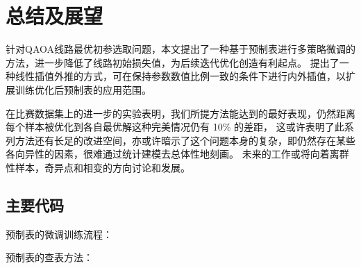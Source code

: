 \documentclass[withoutpreface,bwprint]{cumcmthesis}
\begin{document}
\section{总结及展望}

针对QAOA线路最优初参选取问题，本文提出了一种基于预制表进行多策略微调的方法，进一步降低了线路初始损失值，为后续迭代优化创造有利起点。
提出了一种线性插值外推的方式，可在保持参数数值比例一致的条件下进行内外插值，以扩展训练优化后预制表的应用范围。

在比赛数据集上的进一步的实验表明，我们所提方法能达到的最好表现，仍然距离每个样本被优化到各自最优解这种完美情况仍有 10\% 的差距，
这或许表明了此系列方法还有长足的改进空间，亦或许暗示了这个问题本身的复杂，即仍然存在某些各向异性的因素，很难通过统计建模去总体性地刻画。
未来的工作或将向着离群性样本，奇异点和相变的方向讨论和发展。


\nocite{*}


\newpage
\begin{appendices}

\section{主要代码}

预制表的微调训练流程：



预制表的查表方法：



\end{appendices}
\end{document}

